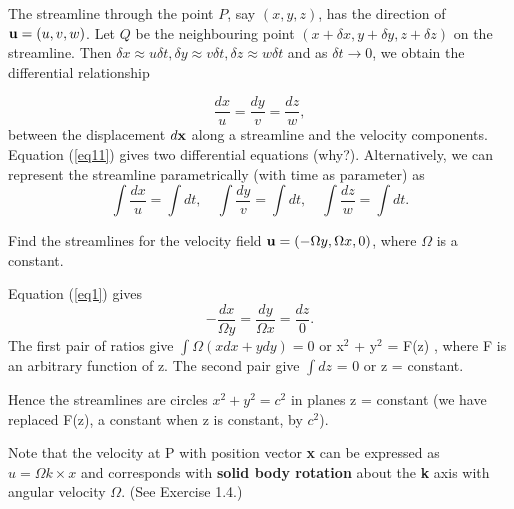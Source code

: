 \documentclass[10pt]{report}
\begin{document}
The streamline through the point $P$, say $(x,y,z)$, has the direction of  ${\bf u} = (u,v,w)$. Let $Q$ be the neighbouring point $(x + \delta x, y + \delta y, z + \delta z)$ on the streamline. Then $\delta x \approx  u \delta t , \delta y \approx  v \delta t , \delta z \approx w \delta t$ and as $\delta t \to  0$, we obtain the differential relationship

%
%

\begin{equation}
\label{eq11}
\frac{dx}{u}=\frac{dy}{v}=\frac{dz}{w},
\end{equation}
between the displacement $d{\bf x}$ along a streamline and the velocity components. Equation (\ref{eq11}) gives two differential equations (why?). Alternatively, we can represent the streamline parametrically (with time as parameter) as
\begin{equation}
\label{eq2}
\int {\frac{dx}{u}} =\int {dt},\quad \int {\frac{dy}{v}} =\int {dt},\quad  \int {\frac{dz}{w}} =\int {dt} .
\end{equation}


\begin{examplebox}
Find the streamlines for the velocity field ${\bf u}=(-\Omega y, \Omega x,0)$, where $\Omega $ is a constant.

\begin{examplesolution1}
Equation (\ref{eq1}) gives
\begin{equation*}
	-\frac{dx}{\Omega y}=\frac{dy}{\Omega x}=\frac{dz}{0}.
\end{equation*}
The first pair of ratios give $\int {\Omega (xdx+ydy)=0} $ or x$^{2}$ + y$^{2}$ = F(z) ,
where F is an arbitrary function of z. The second pair give $\int {dz} $ = 0 or z = constant.

Hence the streamlines are circles $x^{2} + y^{2} = c^{2}$ in planes z = constant
(we have replaced F(z), a constant when z is constant, by $c^{2}$).

Note that the velocity at P with position vector \textbf{x} can be expressed as
$u=\Omega k\times x$ and corresponds with \textbf{solid body rotation} about
the\textbf{ k} axis with angular velocity \textbf{$\Omega$}. (See Exercise 1.4.)

%
%

\end{examplesolution1}
\end{examplebox}
\end{document}
